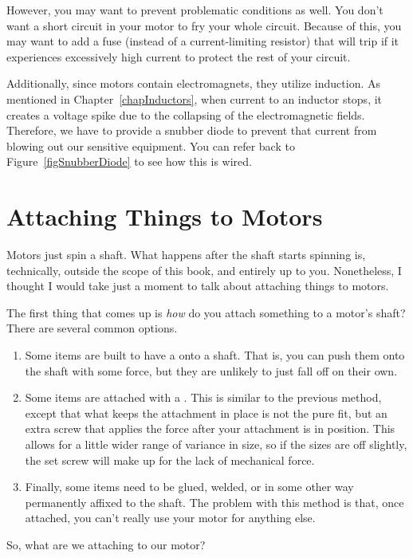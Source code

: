 However, you may want to prevent problematic conditions as well.
You don't want a short circuit in your motor to fry your whole circuit.
Because of this, you may want to add a fuse (instead of a current-limiting resistor) that will trip if it experiences excessively high current to protect the rest of your circuit.

Additionally, since motors contain electromagnets, they utilize induction.
As mentioned in Chapter~\ref{chapInductors}, when current to an inductor stops, it creates a voltage spike due to the collapsing of the electromagnetic fields.
Therefore, we have to provide a snubber diode to prevent that current from blowing out our sensitive equipment.
You can refer back to Figure~\ref{figSnubberDiode} to see how this is wired.

\section{Attaching Things to Motors}

Motors just spin a shaft.
What happens after the shaft starts spinning is, technically, outside the scope of this book, and entirely up to you.
Nonetheless, I thought I would take just a moment to talk about attaching things to motors.

The first thing that comes up is \emph{how} do you attach something to a motor's shaft?
There are several common options.

\begin{enumerate}
\item Some items are built to have a  onto a shaft.  That is, you can push them onto the shaft with some force, but they are unlikely to just fall off on their own.  
\item Some items are attached with a .  This is similar to the previous method, except that what keeps the attachment in place is not the pure fit, but an extra screw that applies the force after your attachment is in position.  This allows for a little wider range of variance in size, so if the sizes are off slightly, the set screw will make up for the lack of mechanical force.
\item Finally, some items need to be glued, welded, or in some other way permanently affixed to the shaft.  The problem with this method is that, once attached, you can't really use your motor for anything else.
\end{enumerate}

So, what are we attaching to our motor?

